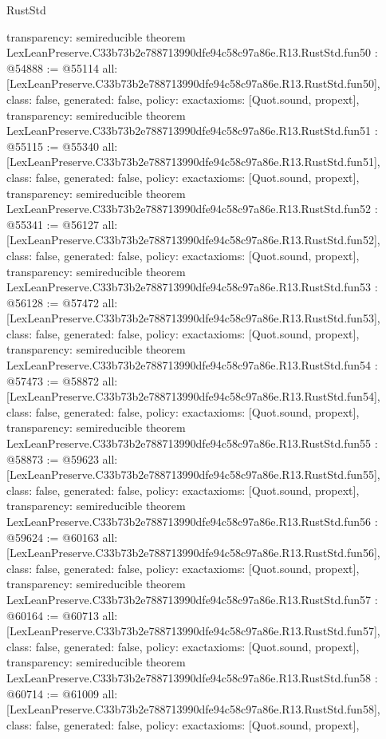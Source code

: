 \begin{lexlean}{RustStd}
\begin{coremodule}
{  transparency: semireducible
}
theorem LexLeanPreserve.C33b73b2e788713990dfe94c58c97a86e.R13.RustStd.fun50 : @54888 := @55114 {
  all: [LexLeanPreserve.C33b73b2e788713990dfe94c58c97a86e.R13.RustStd.fun50],
  class: false,
  generated: false,
  policy: exact{axioms: [Quot.sound, propext]},
  transparency: semireducible
}
theorem LexLeanPreserve.C33b73b2e788713990dfe94c58c97a86e.R13.RustStd.fun51 : @55115 := @55340 {
  all: [LexLeanPreserve.C33b73b2e788713990dfe94c58c97a86e.R13.RustStd.fun51],
  class: false,
  generated: false,
  policy: exact{axioms: [Quot.sound, propext]},
  transparency: semireducible
}
theorem LexLeanPreserve.C33b73b2e788713990dfe94c58c97a86e.R13.RustStd.fun52 : @55341 := @56127 {
  all: [LexLeanPreserve.C33b73b2e788713990dfe94c58c97a86e.R13.RustStd.fun52],
  class: false,
  generated: false,
  policy: exact{axioms: [Quot.sound, propext]},
  transparency: semireducible
}
theorem LexLeanPreserve.C33b73b2e788713990dfe94c58c97a86e.R13.RustStd.fun53 : @56128 := @57472 {
  all: [LexLeanPreserve.C33b73b2e788713990dfe94c58c97a86e.R13.RustStd.fun53],
  class: false,
  generated: false,
  policy: exact{axioms: [Quot.sound, propext]},
  transparency: semireducible
}
theorem LexLeanPreserve.C33b73b2e788713990dfe94c58c97a86e.R13.RustStd.fun54 : @57473 := @58872 {
  all: [LexLeanPreserve.C33b73b2e788713990dfe94c58c97a86e.R13.RustStd.fun54],
  class: false,
  generated: false,
  policy: exact{axioms: [Quot.sound, propext]},
  transparency: semireducible
}
theorem LexLeanPreserve.C33b73b2e788713990dfe94c58c97a86e.R13.RustStd.fun55 : @58873 := @59623 {
  all: [LexLeanPreserve.C33b73b2e788713990dfe94c58c97a86e.R13.RustStd.fun55],
  class: false,
  generated: false,
  policy: exact{axioms: [Quot.sound, propext]},
  transparency: semireducible
}
theorem LexLeanPreserve.C33b73b2e788713990dfe94c58c97a86e.R13.RustStd.fun56 : @59624 := @60163 {
  all: [LexLeanPreserve.C33b73b2e788713990dfe94c58c97a86e.R13.RustStd.fun56],
  class: false,
  generated: false,
  policy: exact{axioms: [Quot.sound, propext]},
  transparency: semireducible
}
theorem LexLeanPreserve.C33b73b2e788713990dfe94c58c97a86e.R13.RustStd.fun57 : @60164 := @60713 {
  all: [LexLeanPreserve.C33b73b2e788713990dfe94c58c97a86e.R13.RustStd.fun57],
  class: false,
  generated: false,
  policy: exact{axioms: [Quot.sound, propext]},
  transparency: semireducible
}
theorem LexLeanPreserve.C33b73b2e788713990dfe94c58c97a86e.R13.RustStd.fun58 : @60714 := @61009 {
  all: [LexLeanPreserve.C33b73b2e788713990dfe94c58c97a86e.R13.RustStd.fun58],
  class: false,
  generated: false,
  policy: exact{axioms: [Quot.sound, propext]},
}
\end{coremodule}
\end{lexlean}

